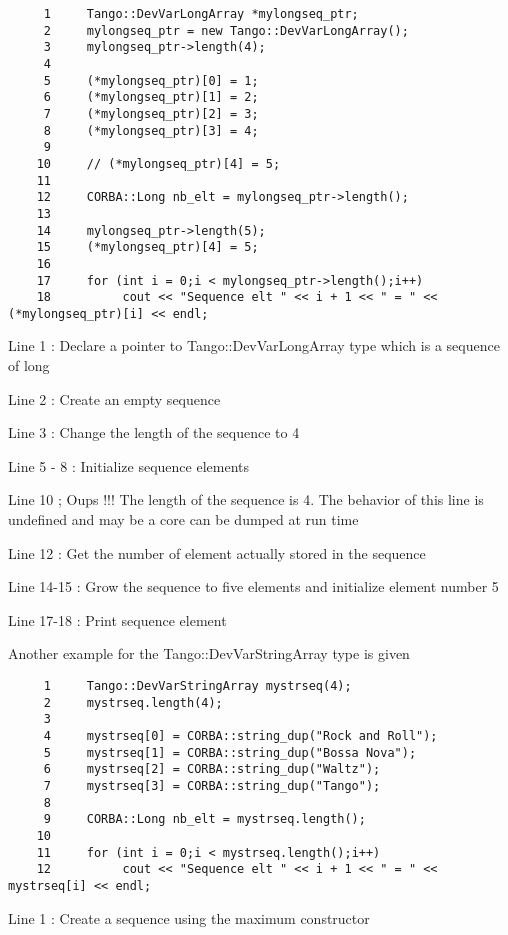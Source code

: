\begin{verbatim}
     1     Tango::DevVarLongArray *mylongseq_ptr;
     2     mylongseq_ptr = new Tango::DevVarLongArray();
     3     mylongseq_ptr->length(4);
     4  
     5     (*mylongseq_ptr)[0] = 1;
     6     (*mylongseq_ptr)[1] = 2;
     7     (*mylongseq_ptr)[2] = 3;
     8     (*mylongseq_ptr)[3] = 4;
     9  
    10     // (*mylongseq_ptr)[4] = 5;
    11  
    12     CORBA::Long nb_elt = mylongseq_ptr->length();
    13  
    14     mylongseq_ptr->length(5);
    15     (*mylongseq_ptr)[4] = 5;
    16  
    17     for (int i = 0;i < mylongseq_ptr->length();i++)
    18          cout << "Sequence elt " << i + 1 << " = " << (*mylongseq_ptr)[i] << endl;
\end{verbatim}


Line 1 : Declare a pointer to Tango::DevVarLongArray type which is
a sequence of long

Line 2 : Create an empty sequence

Line 3 : Change the length of the sequence to 4

Line 5 - 8 : Initialize sequence elements

Line 10 ; Oups !!! The length of the sequence is 4. The behavior of
this line is undefined and may be a core can be dumped at run time

Line 12 : Get the number of element actually stored in the sequence

Line 14-15 : Grow the sequence to five elements and initialize element
number 5

Line 17-18 : Print sequence element

Another example for the Tango::DevVarStringArray
type is given


\begin{verbatim}
     1     Tango::DevVarStringArray mystrseq(4);
     2     mystrseq.length(4);
     3  
     4     mystrseq[0] = CORBA::string_dup("Rock and Roll");
     5     mystrseq[1] = CORBA::string_dup("Bossa Nova");
     6     mystrseq[2] = CORBA::string_dup("Waltz");
     7     mystrseq[3] = CORBA::string_dup("Tango");
     8  
     9     CORBA::Long nb_elt = mystrseq.length();
    10  
    11     for (int i = 0;i < mystrseq.length();i++)
    12          cout << "Sequence elt " << i + 1 << " = " << mystrseq[i] << endl;
\end{verbatim}


Line 1 : Create a sequence using the maximum constructor

